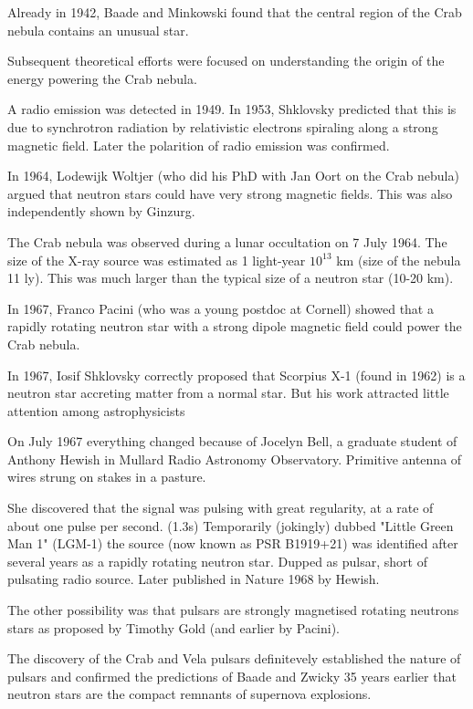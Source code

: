 Already in 1942, Baade and Minkowski found that the central region of the Crab nebula contains an unusual star.

Subsequent theoretical efforts were focused on understanding the origin of the energy powering the Crab nebula.

A radio emission was detected in 1949. 
In 1953, Shklovsky predicted that this is due to synchrotron radiation by relativistic electrons spiraling along a strong magnetic field. 
Later the polarition of radio emission was confirmed. 

In 1964, Lodewijk Woltjer (who did his PhD with Jan Oort on the Crab nebula) argued that neutron stars could have very strong magnetic fields. \cite{Woltjer64}
This was also independently shown by Ginzurg. \cite{Ginzburg64}


The Crab nebula was observed during a lunar occultation on 7 July 1964.\cite{BBC64}
The size of the X-ray source was estimated as 1 light-year $10^{13}$ km (size of the nebula 11 ly). 
This was much larger than the typical size of a neutron star (10-20 km).

In 1967, Franco Pacini (who was a young postdoc at Cornell) showed that a rapidly rotating neutron star with a strong dipole magnetic field could power the Crab nebula.

In 1967, Iosif Shklovsky correctly proposed that Scorpius X-1 (found in 1962) is a neutron star accreting matter from a normal star. \cite{Shklovsky67}
But his work attracted little attention among astrophysicists

On July 1967 everything changed because of Jocelyn Bell, a graduate student of Anthony Hewish in Mullard Radio Astronomy Observatory.
Primitive antenna of wires strung on stakes in a pasture.

She discovered that the signal was pulsing with great regularity, at a rate of about one pulse per second. (1.3s)
Temporarily (jokingly) dubbed "Little Green Man 1" (LGM-1) the source (now known as PSR B1919+21) was identified after several years as a rapidly rotating neutron star.
Dupped as pulsar, short of pulsating radio source.
Later published in Nature 1968 by Hewish. \cite{Hewish68}


The other possibility was that pulsars are strongly magnetised rotating neutrons stars as proposed by Timothy Gold (and earlier by Pacini).
\cite{Gold68}

The discovery of the Crab and Vela pulsars definitevely established the nature of pulsars and confirmed the predictions of Baade and Zwicky 35 years earlier that neutron stars are the compact remnants of supernova explosions.

